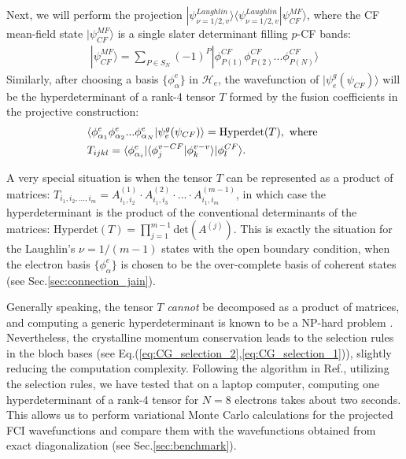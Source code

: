 Next, we will perform the projection $|\psi^{Laughlin}_{\nu=1/2,v}\rangle\langle\psi^{Laughlin}_{\nu=1/2,v}|\psi_{CF}^{MF}\rangle$, where the CF mean-field state $|\psi_{CF}^{MF}\rangle$ is a single slater determinant filling $p$-CF bands:
\begin{align}
|\psi_{CF}^{MF}\rangle=\sum_{P\in S_N} (-1)^P |\phi^{CF}_{P(1)}\phi^{CF}_{P(2)}...\phi^{CF}_{P(N)}\rangle
\end{align}
Similarly, after choosing a basis $\{\phi^e_{\alpha}\}$ in $\mathcal H_e$, the wavefunction of $|\psi^g_e(\psi_{CF})\rangle$ will be the hyperdeterminant of a rank-4 tensor $T$ formed by the fusion coefficients in the projective construction:
\begin{align}
&\langle \phi^e_{\alpha_1}\phi^e_{\alpha_2}...\phi^e_{\alpha_N}|\psi^g_e(\psi_{CF})\rangle=\text{Hyperdet}(T), \text { where }\notag\\
& T_{ijkl}=\langle \phi^e_{\alpha_i}|\langle \phi^{v-CF}_{j}|\phi^{v-v}_{k}\rangle |\phi^{CF}_{l}\rangle.\label{eq:hyperdet_T}
\end{align}


A very special situation is when the tensor $T$ can be represented as a product of matrices: $T_{i_1,i_2,...,i_m}=A^{(1)}_{i_1,i_2}\cdot A^{(2)}_{i_1,i_3}\cdot...\cdot A^{(m-1)}_{i_1,i_m}$, in which case the hyperdeterminant is the product of the conventional determinants of the matrices: $\text{Hyperdet}(T)=\prod_{j=1}^{m-1}\text{det}(A^{(j)})$. This is exactly the situation for the Laughlin's $\nu=1/(m-1)$ states with the open boundary condition, when the electron basis $\{\phi^e_{\alpha}\}$ is chosen to be the over-complete basis of coherent states (see Sec.\ref{sec:connection_jain}). 

Generally speaking, the tensor $T$ \emph{cannot} be decomposed as a product of matrices, and computing a generic hyperdeterminant is known to be a NP-hard problem \cite{hillar2013most}. Nevertheless, the crystalline momentum conservation leads to the selection rules in the bloch bases (see Eq.(\ref{eq:CG_selection_2},\ref{eq:CG_selection_1})), slightly reducing the computation complexity. Following the algorithm in Ref.\cite{barvinok1995new}, utilizing the selection rules, we have tested that on a laptop computer, computing one hyperdeterminant of a rank-4 tensor for $N=8$ electrons takes about two seconds. This allows us to perform variational Monte Carlo calculations for the projected FCI wavefunctions and compare them with the wavefunctions obtained from exact diagonalization (see Sec.\ref{sec:benchmark}).



